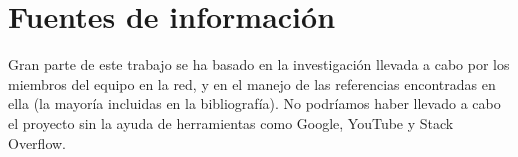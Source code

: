 \section{Fuentes de información}
Gran parte de este trabajo se ha basado en la investigación llevada a cabo por los miembros del equipo
en la red, y en el manejo de las referencias encontradas en ella (la mayoría incluidas en la bibliografía).
No podríamos haber llevado a cabo el proyecto sin la ayuda de herramientas como Google, YouTube
y Stack Overflow.
